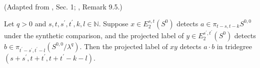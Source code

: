 \begin{theorem}
\label{frontier:Literature:5ea1d02075a4}
(Adapted from \cite{Moss}, Sec. 1; \cite{BHS}, Remark 9.5.)\par{}

Let $q>0$ and $s,t,s^{\prime},t^{\prime},k,l\in\mathbb N$. Suppose $x\in E_2^{s,t}(S^0)$ detects $a\in\pi_{t-s,t-k}S^{0,0}$ under the synthetic comparison, and the projected label of $y\in E_2^{s^{\prime},t^{\prime}}(S^0)$ detects $b\in\pi_{t^{\prime}-s^{\prime},t^{\prime}-l}(S^{0,0}/\lambda^q)$. Then the projected label of $xy$ detects $a\cdot b$ in tridegree $(s+s^{\prime},t+t^{\prime},t+t^{\prime}-k-l)$.
\end{theorem}

